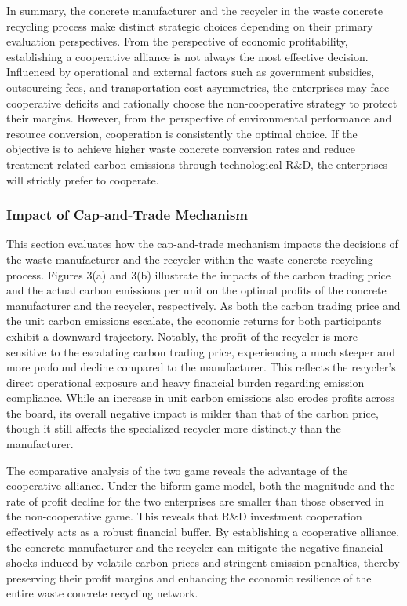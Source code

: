 \documentclass[authoryear,preprint,review,times,10pt]{elsarticle}
\begin{document}
In summary, the concrete manufacturer and the recycler in the waste concrete recycling process make distinct strategic choices depending on their primary evaluation perspectives. From the perspective of economic profitability, establishing a cooperative alliance is not always the most effective decision. Influenced by operational and external factors such as government subsidies, outsourcing fees, and transportation cost asymmetries, the enterprises may face cooperative deficits and rationally choose the non-cooperative strategy to protect their margins. However, from the perspective of environmental performance and resource conversion, cooperation is consistently the optimal choice. If the objective is to achieve higher waste concrete conversion rates and reduce treatment-related carbon emissions through technological R\&D, the enterprises will strictly prefer to cooperate.

\subsubsection{Impact of Cap-and-Trade Mechanism}
\label{sec:cap_and_trade}

This section evaluates how the cap-and-trade mechanism impacts the decisions of the waste manufacturer and the recycler within the waste concrete recycling process. Figures 3(a) and 3(b) illustrate the impacts of the carbon trading price and the actual carbon emissions per unit on the optimal profits of the concrete manufacturer and the recycler, respectively. As both the carbon trading price and the unit carbon emissions escalate, the economic returns for both participants exhibit a downward trajectory. Notably, the profit of the recycler is more sensitive to the escalating carbon trading price, experiencing a much steeper and more profound decline compared to the manufacturer. This reflects the recycler's direct operational exposure and heavy financial burden regarding emission compliance. While an increase in unit carbon emissions also erodes profits across the board, its overall negative impact is milder than that of the carbon price, though it still affects the specialized recycler more distinctly than the manufacturer.

The comparative analysis of the two game reveals the advantage of the cooperative alliance. Under the biform game model, both the magnitude and the rate of profit decline for the two enterprises are smaller than those observed in the non-cooperative game. This reveals that R\&D investment cooperation effectively acts as a robust financial buffer. By establishing a cooperative alliance, the concrete manufacturer and the recycler can mitigate the negative financial shocks induced by volatile carbon prices and stringent emission penalties, thereby preserving their profit margins and enhancing the economic resilience of the entire waste concrete recycling network.
\end{document}
